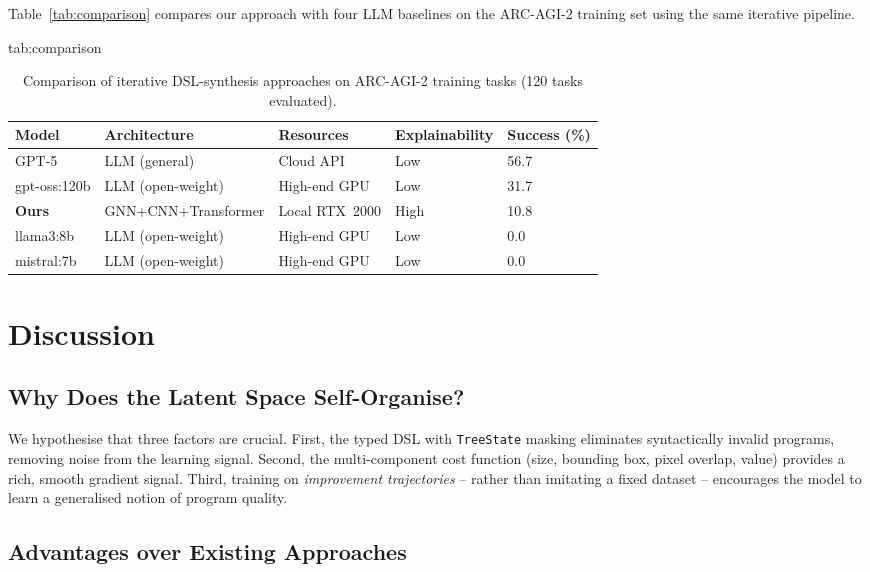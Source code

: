 \documentclass[final]{nesy2027}
\begin{document}
Table~\ref{tab:comparison} compares our approach with four LLM baselines on the
ARC-AGI-2 training set using the same iterative pipeline.

\begin{table}[htbp]
\floatconts
  {tab:comparison}
  {\caption{Comparison of iterative DSL-synthesis approaches on
    ARC-AGI-2 training tasks (120 tasks evaluated).}}
  {%
  \begin{tabular}{lllll}
  \toprule
  \bfseries Model & \bfseries Architecture & \bfseries Resources
    & \bfseries Explainability & \bfseries Success (\%) \\
  \midrule
  GPT-5           & LLM (general)        & Cloud API       & Low  & 56.7 \\
  gpt-oss:120b    & LLM (open-weight)    & High-end GPU    & Low  & 31.7 \\
  \textbf{Ours}   & GNN+CNN+Transformer  & Local RTX~2000  & High & 10.8 \\
  llama3:8b       & LLM (open-weight)    & High-end GPU    & Low  & 0.0 \\
  mistral:7b      & LLM (open-weight)    & High-end GPU    & Low  & 0.0 \\
  \bottomrule
  \end{tabular}}
\end{table}

\section{Discussion}
\label{sec:discussion}

\subsection{Why Does the Latent Space Self-Organise?}

We hypothesise that three factors are crucial.
First, the typed DSL with \texttt{TreeState} masking eliminates syntactically
invalid programs, removing noise from the learning signal.
Second, the multi-component cost function (size, bounding box, pixel overlap,
value) provides a rich, smooth gradient signal.
Third, training on \emph{improvement trajectories} -- rather than imitating a
fixed dataset -- encourages the model to learn a generalised notion of program
quality.

\subsection{Advantages over Existing Approaches}
\end{document}
